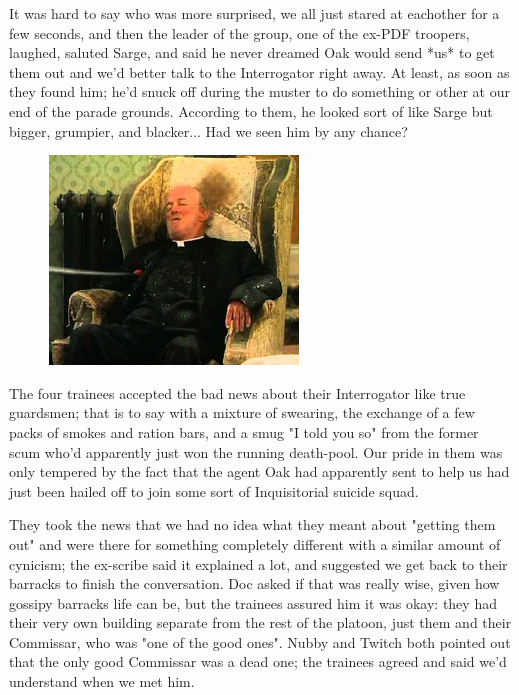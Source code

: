 It was hard to say who was more surprised, we all just stared at eachother for a few seconds, and then the leader of the group, one of the ex-PDF troopers, laughed, saluted Sarge, and said he never dreamed Oak would send *us* to get them out and we'd better talk to the Interrogator right away. 
At least, as soon as they found him; 
he'd snuck off during the muster to do something or other at our end of the parade grounds. 
According to them, he looked sort of like Sarge but bigger, grumpier, and blacker... 
Had we seen him by any chance? 


\begin{figure}
	\begin{center}
		\includegraphics[width=\figwidth]{pics/21/12.png}
	\end{center}
\end{figure}
The four trainees accepted the bad news about their Interrogator like true guardsmen; 
that is to say with a mixture of swearing, the exchange of a few packs of smokes and ration bars, and a smug "I told you so" from the former scum who'd apparently just won the running death-pool. 
Our pride in them was only tempered by the fact that the agent Oak had apparently sent to help us had just been hailed off to join some sort of Inquisitorial suicide squad. 


They took the news that we had no idea what they meant about "getting them out" and were there for something completely different with a similar amount of cynicism; 
the ex-scribe said it explained a lot, and suggested we get back to their barracks to finish the conversation. 
Doc asked if that was really wise, given how gossipy barracks life can be, but the trainees assured him it was okay: 
they had their very own building separate from the rest of the platoon, just them  and their Commissar, who was "one of the good ones". 
Nubby and Twitch both pointed out that the only good Commissar was a dead one; 
the trainees agreed and said we'd understand when we met him. 


